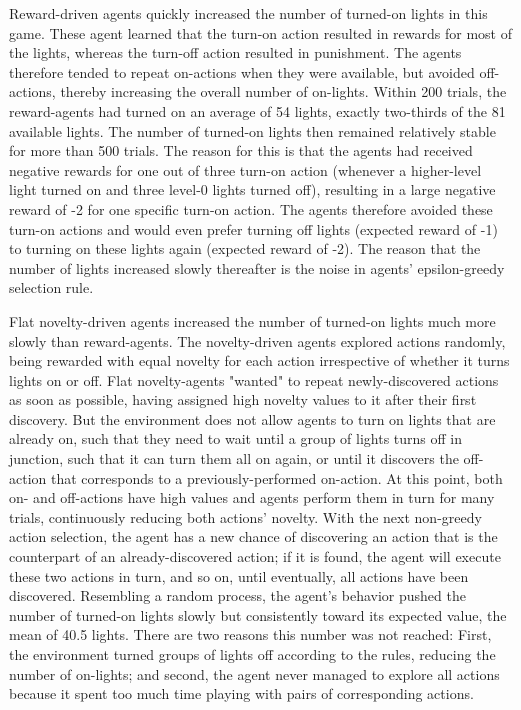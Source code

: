 \documentclass{article}
\begin{document}
Reward-driven agents quickly increased the number of turned-on lights in this game. These agent learned that the turn-on action resulted in rewards for most of the lights, whereas the turn-off action resulted in punishment. The agents therefore tended to repeat on-actions when they were available, but avoided off-actions, thereby increasing the overall number of on-lights. Within 200 trials, the reward-agents had turned on an average of 54 lights, exactly two-thirds of the 81 available lights. The number of turned-on lights then remained relatively stable for more than 500 trials. The reason for this is that the agents had received negative rewards for one out of three turn-on action (whenever a higher-level light turned on and three level-0 lights turned off), resulting in a large negative reward of -2 for one specific turn-on action. The agents therefore avoided these turn-on actions and would even prefer turning off lights (expected reward of -1) to turning on these lights again (expected reward of -2). The reason that the number of lights increased slowly thereafter is the noise in agents' epsilon-greedy selection rule. 

Flat novelty-driven agents increased the number of turned-on lights much more slowly than reward-agents. The novelty-driven agents explored actions randomly, being rewarded with equal novelty for each action irrespective of whether it turns lights on or off. Flat novelty-agents "wanted" to repeat newly-discovered actions as soon as possible, having assigned high novelty values to it after their first discovery. But the environment does not allow agents to turn on lights that are already on, such that they need to wait until a group of lights turns off in junction, such that it can turn them all on again, or until it discovers the off-action that corresponds to a previously-performed on-action. At this point, both on- and off-actions have high values and agents perform them in turn for many trials, continuously reducing both actions' novelty. With the next non-greedy action selection, the agent has a new chance of discovering an action that is the counterpart of an already-discovered action; if it is found, the agent will execute these two actions in turn, and so on, until eventually, all actions have been discovered. Resembling a random process, the agent's behavior pushed the number of turned-on lights slowly but consistently toward its expected value, the mean of 40.5 lights. There are two reasons this number was not reached: First, the environment turned groups of lights off according to the rules, reducing the number of on-lights; and second, the agent never managed to explore all actions because it spent too much time playing with pairs of corresponding actions. 
\end{document}
